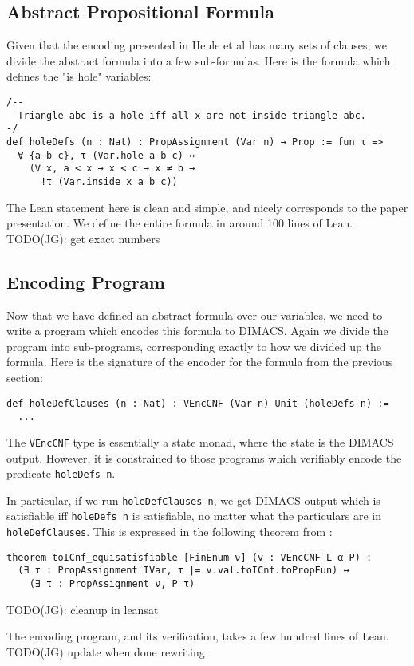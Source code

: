 \subsection{Abstract Propositional Formula}

Given that the encoding presented in Heule et al has many sets of clauses,
we divide the abstract formula into a few sub-formulas.
Here is the formula which defines the "is hole" variables:
\begin{lstlisting}
/--
  Triangle abc is a hole iff all x are not inside triangle abc.
-/
def holeDefs (n : Nat) : PropAssignment (Var n) → Prop := fun τ =>
  ∀ {a b c}, τ (Var.hole a b c) ↔
    (∀ x, a < x → x < c → x ≠ b →
      !τ (Var.inside x a b c))
\end{lstlisting}
The Lean statement here is clean and simple,
and nicely corresponds to the paper presentation.
We define the entire formula in around 100 lines of Lean.
TODO(JG): get exact numbers

\subsection{Encoding Program}

Now that we have defined an abstract formula over our variables,
we need to write a program which encodes this formula to DIMACS.
Again we divide the program into sub-programs,
corresponding exactly to how we divided up the formula.
Here is the signature of the encoder for the formula from the previous section:
\begin{lstlisting}
def holeDefClauses (n : Nat) : VEncCNF (Var n) Unit (holeDefs n) :=
  ...
\end{lstlisting}
The \texttt{VEncCNF} type is essentially a state monad,
where the state is the DIMACS output.
However, it is constrained to those programs which
verifiably encode the predicate \texttt{holeDefs n}.

In particular, if we run \texttt{holeDefClauses n},
we get DIMACS output which is satisfiable iff \texttt{holeDefs n} is satisfiable,
no matter what the particulars are in \texttt{holeDefClauses}.
This is expressed in the following theorem from \leansat{}:
\begin{lstlisting}
theorem toICnf_equisatisfiable [FinEnum ν] (v : VEncCNF L α P) :
  (∃ τ : PropAssignment IVar, τ |= v.val.toICnf.toPropFun) ↔
    (∃ τ : PropAssignment ν, P τ)
\end{lstlisting}
TODO(JG): cleanup in leansat

The encoding program, and its verification,
takes a few hundred lines of Lean.
TODO(JG) update when done rewriting

